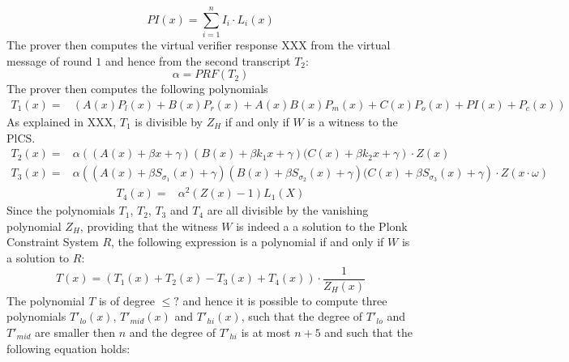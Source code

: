 \begin{equation}
PI(x) = \textstyle \sum_{i=1}^n I_i\cdot L_i(x)
\end{equation}
The prover then computes the virtual verifier response XXX from the virtual message of round $1$ and hence from the second transcript $T_2$: 
\begin{equation}
\alpha=PRF(T_2)
\end{equation}
The prover then computes the following polynomials
\begin{equation}
\begin{array}{rl}
T_1(x) = & \left(A(x)P_l(x) + B(x)P_r(x) +A(x)B(x)P_m(x) + C(x)P_o(x) + PI(x) + P_c(x)\right)
\end{array}
\end{equation}
As explained in XXX, $T_1$ is divisible by $Z_H$ if and only if $W$ is a witness to the PlCS. 
\begin{equation}
\begin{array}{rl}
T_2(x) = & \alpha\left((A(x) + \beta x + \gamma)(B(x) + \beta k_1 x + \gamma)(C(x) + \beta k_2 x + \gamma\right)\cdot Z(x)
\end{array}
\end{equation}
\begin{equation}
\begin{array}{rl}
T_3(x) = & \alpha\left((A(x) + \beta S_{\sigma_1}(x) + \gamma)(B(x) + \beta S_{\sigma_2}(x) + \gamma)(C(x) + \beta S_{\sigma_3}(x) + \gamma\right)\cdot Z(x\cdot\omega) 
\end{array}
\end{equation}
\begin{equation}
\begin{array}{rl}
T_4(x) = &  \alpha^2(Z(x) - 1)L_1(X)
\end{array}
\end{equation}
Since the polynomials $T_1$, $T_2$, $T_3$ and $T_4$ are all divisible by the vanishing polynomial $Z_H$, providing that the witness $W$ is indeed a a solution to the Plonk Constraint System $R$, the following expression is a polynomial if and only if $W$ is a solution to $R$:
\begin{equation}
T(x) = \left( T_1(x) + T_2(x) - T_3(x) + T_4(x)\right)\cdot \frac{1}{Z_H(x)}
\end{equation}
The polynomial $T$ is of degree $\leq ?$ and hence it is possible to compute three polynomials $T'_{lo}(x)$, $T'_{mid}(x)$ and $T'_{hi}(x)$, such that the degree of $T'_{lo}$ and $T'_{mid}$ are smaller then $n$ and the degree of $T'_{hi}$ is at most $n+5$ and such that the following equation holds:
